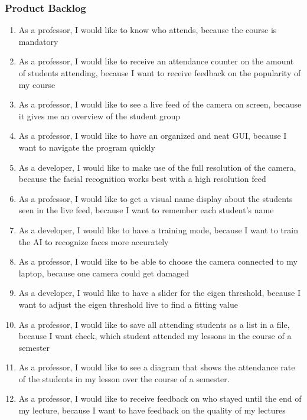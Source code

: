 \documentclass[12pt, a4paper]{article}
\begin{document}
\subsubsection{Product Backlog}
\begin{enumerate}
\item As a professor, I would like to know who attends, because the course is mandatory
\item As a professor, I would like to receive an attendance counter on the amount of students attending, because I want to receive feedback on the popularity of my course
\item As a professor, I would like to see a live feed of the camera on screen, because it gives me an overview of the student group
\item As a professor, I would like to have an organized and neat GUI, because I want to navigate the program quickly
\item As a developer, I would like to make use of the full resolution of the camera, because the facial recognition works best with a high resolution feed
\item As a professor, I would like to get a visual name display about the students seen in the live feed, because I want to remember each student's name
\item As a developer, I would like to have a training mode, because I want to train the AI to recognize faces more accurately
\item As a professor, I would like to be able to choose the camera connected to my laptop, because one camera could get damaged
\item As a developer, I would like to have a slider for the eigen threshold, because I want to adjust the eigen threshold live to find a fitting value
\item As a professor, I would like to save all attending students as a list in a file, because I want check, which student attended my lessons in the course of a semester
\item As a professor, I would like to see a diagram that shows the attendance rate of the students in my lesson over the course of a semester.
\item As a professor, I would like to receive feedback on who stayed until the end of my lecture, because I want to have feedback on the quality of my lectures
\end{enumerate}
\end{document}
